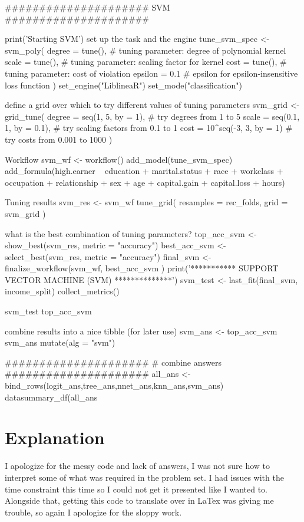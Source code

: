 \documentclass{article}
\begin{document}
#####################
SVM
#####################

print('Starting SVM')
set up the task and the engine
tune_svm_spec <- svm_poly(
  degree = tune(), # tuning parameter: degree of polynomial kernel
  scale = tune(), # tuning parameter: scaling factor for kernel
  cost = tune(), # tuning parameter: cost of violation
  epsilon = 0.1 # epsilon for epsilon-insensitive loss function
) %
  set_engine("LiblineaR") %
  set_mode("classification")

define a grid over which to try different values of tuning parameters
svm_grid <- grid_tune(
  degree = seq(1, 5, by = 1), # try degrees from 1 to 5
  scale = seq(0.1, 1, by = 0.1), # try scaling factors from 0.1 to 1
  cost = 10^seq(-3, 3, by = 1) # try costs from 0.001 to 1000
)

Workflow
svm_wf <- workflow() %
  add_model(tune_svm_spec) %
  add_formula(high.earner ~ education + marital.status + race + workclass + occupation + relationship + sex + age + capital.gain + capital.loss + hours)

Tuning results
svm_res <- svm_wf %
  tune_grid(
    resamples = rec_folds,
    grid = svm_grid
  )

what is the best combination of tuning parameters?
top_acc_svm <- show_best(svm_res, metric = "accuracy")
best_acc_svm <- select_best(svm_res, metric = "accuracy")
final_svm <- finalize_workflow(svm_wf,
                               best_acc_svm
)
print('*********** SUPPORT VECTOR MACHINE (SVM) **************')
svm_test <- last_fit(final_svm, income_split) %
  collect_metrics()

svm_test %
top_acc_svm %

combine results into a nice tibble (for later use)
svm_ans <- top_acc_svm %
svm_ans %
  mutate(alg = "svm") %



#####################
# combine answers
#####################
all_ans <- bind_rows(logit_ans,tree_ans,nnet_ans,knn_ans,svm_ans)
datasummary_df(all_ans %

\section{Explanation}
I apologize for the messy code and lack of answers, I was not sure how to interpret some of what was required in the problem set. I had issues with the time constraint this time so I could not get it presented like I wanted to. Alongside that, getting this code to translate over in LaTex was giving me trouble, so again I apologize for the sloppy work. 
\end{document}
